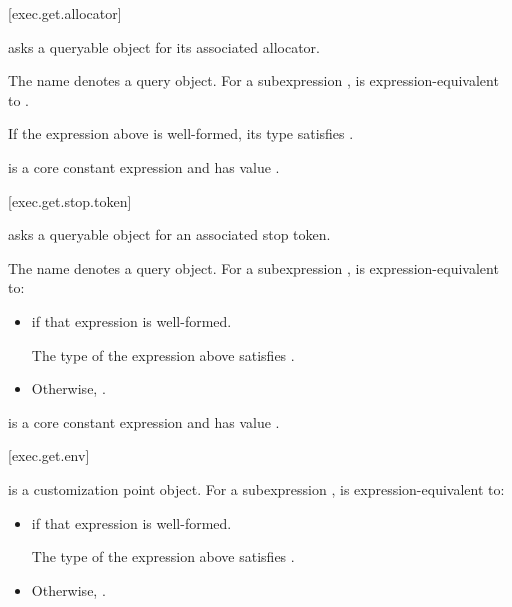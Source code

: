 [exec.get.allocator]{}

\pnum
{} asks a queryable object for its associated allocator.

\pnum
The name  denotes a query object.
For a subexpression ,
 is expression-equivalent to
.

\mandates
If the expression above is well-formed,
its type satisfies
.

\pnum
{} is a core constant expression and
has value .

[exec.get.stop.token]{}

\pnum
{} asks a queryable object for an associated stop token.

\pnum
The name  denotes a query object.
For a subexpression ,
 is expression-equivalent to:
\begin{itemize}
\item
{}
if that expression is well-formed.

\mandates
The type of the expression above satisfies .

\item
Otherwise, .
\end{itemize}

\pnum
{} is a core constant expression and
has value .

[exec.get.env]{}

\pnum
{} is a customization point object.
For a subexpression ,
 is expression-equivalent to:
\begin{itemize}
\item
{}
if that expression is well-formed.

\mandates
The type of the expression above satisfies
.
\item
Otherwise, .
\end{itemize}

